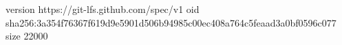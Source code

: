 version https://git-lfs.github.com/spec/v1
oid sha256:3a354f76367f619d9e5901d506b94985c00ec408a764c5feaad3a0bf0596c077
size 22000
